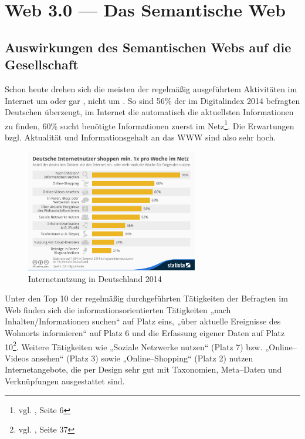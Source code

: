 \section{Web 3.0 --- Das Semantische Web}
\label{sec:hauptteil}

\subsection{Auswirkungen des Semantischen Webs auf die Gesellschaft}

Schon heute drehen sich die meisten der regelmäßig ausgeführtem Aktivitäten im Internet um  oder gar , nicht um . So sind 56\% der im Digitalindex 2014 befragten Deutschen überzeugt, im Internet die automatisch die aktuellsten Informationen zu finden, 60\% sucht benötigte Informationen zuerst im Netz\footnote{vgl. \cite{d21}, Seite 6}. Die Erwartungen bzgl. Aktualität und Informationsgehalt an das \ac{WWW} sind also sehr hoch. 

\begin{figure}[H]
\begin{center}
\includegraphics[width=0.67\textwidth]{inetnutzung.jpg}
\caption[Internetnutzung in Deutschland 2014]{Internetnutzung in Deutschland 2014\protect\footnotemark}
\label{pic:inetnutzung}
\end{center}
\end{figure}

Unter den Top 10 der regelmäßig durchgeführten Tätigkeiten der Befragten im Web finden sich die informationsorientierten Tätigkeiten „nach Inhalten/Informationen suchen“ auf Platz eins, „über aktuelle Ereignisse des Wohnorts informieren“ auf Platz 6 und die Erfassung eigener Daten auf Platz 10\footnote{vgl. \cite{d21}, Seite 37}. Weitere Tätigkeiten wie „Soziale Netzwerke nutzen“ (Platz 7) bzw. „Online--Videos ansehen“ (Platz 3) sowie „Online--Shopping“ (Platz 2) nutzen Internetangebote, die per Design sehr gut mit Taxonomien, Meta--Daten und Verknüpfungen ausgestattet sind.

